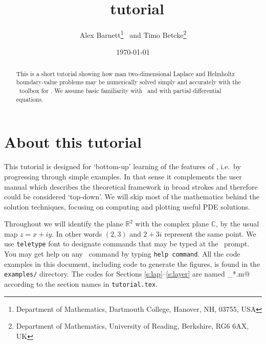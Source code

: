 \documentclass[11pt]{article}
\begin{document}
\title{\mpspack\ tutorial}
\author{Alex Barnett\footnote{Department of Mathematics, Dartmouth College,
Hanover, NH, 03755, USA}
\ and
Timo Betcke\footnote{Department of Mathematics,
University of Reading, Berkshire, RG6 6AX, UK}}
\date{\today}   %

\maketitle
\begin{abstract}
This is a short tutorial showing how man two-dimensional Laplace and Helmholtz
boundary-value problems
may be numerically solved simply and accurately with the \mpspack\ toolbox
for \matlab. We assume basic familiarity with \matlab\
and with partial differential equations.
\end{abstract}


\section{About this tutorial}

This tutorial is designed for `bottom-up' learning of the features
of \mpspack, i.e.\ by progressing through simple examples.
In that sense it complements the user manual which describes
the theoretical framework in broad strokes and therefore could
be considered `top-down'.
We will skip most of the mathematics behind the solution techniques,
focusing on computing and plotting useful PDE solutions.

Throughout we will identify the plane $\mathbb{R}^2$ with the complex
plane $\mathbb{C}$, by the usual map $z=x+iy$. In other words
$(2,3)$ and $2+3i$ represent the same point.
We use {\tt teletype} font to designate commands that may be typed
at the \matlab\ prompt.
You may get help on any \mpspack\ command by typing {\tt help command}.
All the code examples in this document, including code to generate the
figures, is found in the {\tt examples/} directory.
The codes for Sections \ref{s:lap}--\ref{s:layer} are named
\verb@tut_*.m@ according to the section names in {\tt tutorial.tex}.









 

\end{document}
